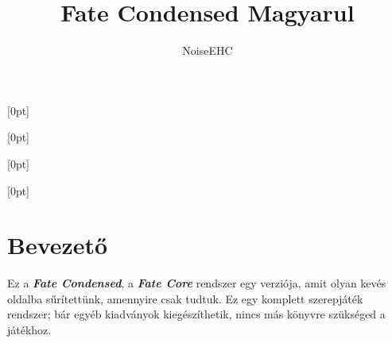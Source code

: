 \documentclass[oneside]{book}
\title{Fate Condensed Magyarul}
\author{NoiseEHC}
\date{}
\newcommand{\fate}[1]{\textbf{\textit{#1}}}
\begin{document}

\titleformat{\chapter}[hang]{}{}{0pt}{\RobotoCondensed\Huge\MakeUppercase}
\titlespacing{\chapter}{0pt}{0pt}{0pt}[0pt]
\titleformat{\section}[hang]{}{}{0pt}{\RobotoCondensed\huge}
\titlespacing{\section}{0pt}{0pt}{0pt}[0pt]
\titleformat{\subsection}[hang]{}{}{0pt}{\RobotoCondensed\LARGE\MakeUppercase}
\titlespacing{\subsection}{0pt}{0pt}{0pt}[0pt]
\titleformat{\subsubsection}[hang]{}{}{0pt}{\RobotoCondensed\large\MakeUppercase}
\titlespacing{\subsubsection}{0pt}{0pt}{0pt}[0pt]

\chapter{Bevezető}

Ez a \fate{Fate Condensed}, a \fate{Fate Core} rendszer egy verziója, amit olyan kevés oldalba sűrítettünk, amennyire csak tudtuk. Ez egy komplett szerepjáték rendszer; bár egyéb kiadványok kiegészíthetik, nincs más könyvre szükséged a játékhoz.
\end{document}
